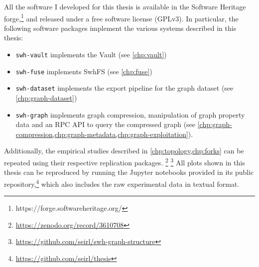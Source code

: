 All the software I developed for this thesis is available in the Software
Heritage forge,\footnote{https://forge.softwareheritage.org/} and released
under a free software license (GPLv3).
In particular, the following software packages implement the various systems
described in this thesis:

\begin{itemize}
    \setlength\itemsep{0em}
    \item \texttt{swh-vault} implements the Vault (see \cref{chp:vault})
    \item \texttt{swh-fuse} implements SwhFS (see \cref{chp:fuse})
    \item \texttt{swh-dataset} implements the export pipeline for the graph
        dataset (see \cref{chp:graph-dataset})
    \item \texttt{swh-graph} implements graph compression, manipulation of
        graph property data and an RPC API to query the compressed
        graph (see
        \cref{chp:graph-compression,chp:graph-metadata,chp:graph-exploitation}).
\end{itemize}

Additionally, the empirical studies described in \cref{chp:topology,chp:forks}
can be repeated using their respective replication
packages.%
\footnote{\url{https://zenodo.org/record/3610708}}%
\footnote{\url{https://github.com/seirl/swh-graph-structure}}
%
All plots shown in this thesis can be reproduced by running the Jupyter
notebooks provided in its public
repository,\footnote{\url{https://github.com/seirl/thesis}}
which also includes the raw experimental data in textual format.
